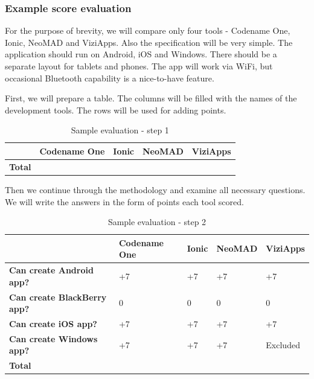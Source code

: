 \documentclass[english,master,public,dept460,male,cpdeclaration,oneside]{diploma}
\begin{document}
\subsubsection{Example score evaluation}
For the purpose of brevity, we will compare only four tools - Codename One, Ionic, NeoMAD and ViziApps. Also the specification will be very simple. The application should run on Android, iOS and Windows. There should be a separate layout for tablets and phones. The app will work via WiFi, but occasional Bluetooth capability is a nice-to-have feature.

First, we will prepare a table. The columns will be filled with the names of the development tools. The rows will be used for adding points.

\begin{table}[!h]
	\centering
	\caption{Sample evaluation - step 1}
	\begin{tabular}{p{2.5cm} | p{2.5cm} | p{2.5cm} | p{2.5cm} | p{2.5cm}}
		\toprule
		& \textbf{Codename One} & \textbf{Ionic} & \textbf{NeoMAD} & \textbf{ViziApps} \\
		\midrule
		\textbf{Total} &&&& \\
		\midrule
	\end{tabular}
\end{table}
	
Then we continue through the methodology and examine all necessary questions. We will write the answers in the form of points each tool scored.

\begin{table}[!h]
	\centering
	\caption{Sample evaluation - step 2}
	\begin{tabular}{p{2.5cm} | p{2.5cm} | p{2.5cm} | p{2.5cm} | p{2.5cm}}
		\toprule
		& \textbf{Codename One} & \textbf{Ionic} & \textbf{NeoMAD} & \textbf{ViziApps} \\
		\midrule
		\textbf{Can create Android app?} & +7 & +7 & +7 & +7 \\
		\textbf{Can create BlackBerry app?} & 0 & 0 & 0 & 0 \\
		\textbf{Can create iOS app?} & +7 & +7 & +7 & +7 \\
		\textbf{Can create Windows app?} & +7 & +7 & +7 & Excluded \\
		\midrule
		\textbf{Total} &&&& \\
		\midrule
	\end{tabular}
\end{table}
\end{document}
